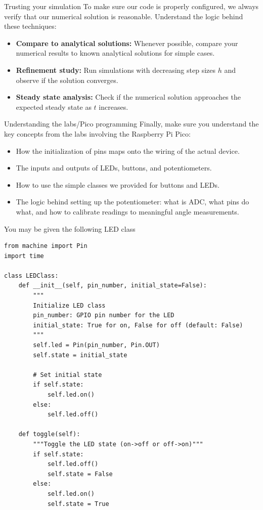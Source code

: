 \documentclass{beamer}
\begin{document}
  \begin{frame}{Trusting your simulation}
    To make sure our code is properly configured, we always verify that our numerical solution is reasonable. Understand the logic behind these techniques:
    \begin{itemize}
      \item \textbf{Compare to analytical solutions:} Whenever possible, compare your numerical results to known analytical solutions for simple cases.
      \item \textbf{Refinement study:} Run simulations with decreasing step sizes \(h\) and observe if the solution converges.
      \item \textbf{Steady state analysis:} Check if the numerical solution approaches the expected steady state as \(t\) increases.
    \end{itemize}
  \end{frame}

\begin{frame}{Understanding the labs/Pico programming}
  Finally, make sure you understand the key concepts from the labs involving the Raspberry Pi Pico:
  \begin{itemize}
    \item How the initialization of pins maps onto the wiring of the actual device.
    \item The inputs and outputs of LEDs, buttons, and potentiometers.
    \item How to use the simple classes we provided for buttons and LEDs.
    \item The logic behind setting up the potentiometer: what is ADC, what pins do what, and how to calibrate readings to meaningful angle measurements.
  \end{itemize}
\end{frame}

\begin{frame}[fragile]{You may be given the following LED class}
    \begin{verbatim}
from machine import Pin
import time

class LEDClass:
    def __init__(self, pin_number, initial_state=False):
        """
        Initialize LED class
        pin_number: GPIO pin number for the LED
        initial_state: True for on, False for off (default: False)
        """
        self.led = Pin(pin_number, Pin.OUT)
        self.state = initial_state
        
        # Set initial state
        if self.state:
            self.led.on()
        else:
            self.led.off()
    
    def toggle(self):
        """Toggle the LED state (on->off or off->on)"""
        if self.state:
            self.led.off()
            self.state = False
        else:
            self.led.on()
            self.state = True
    \end{verbatim}
\end{frame}
\end{document}
